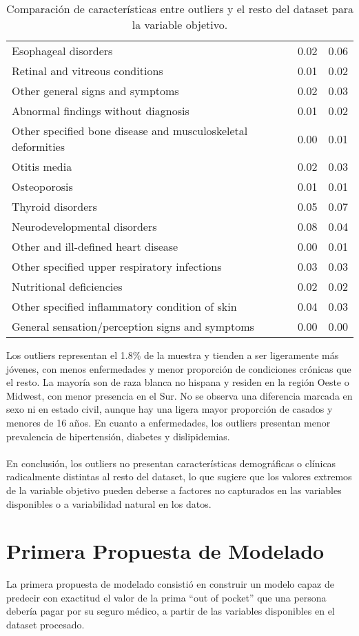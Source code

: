 \documentclass[12pt,a4paper]{article}
\begin{document}
\begin{itemize}
\begin{table}[H]
\begin{tabular}{lcc}
Esophageal disorders & 0.02 & 0.06 \\
Retinal and vitreous conditions & 0.01 & 0.02 \\
Other general signs and symptoms & 0.02 & 0.03 \\
Abnormal findings without diagnosis & 0.01 & 0.02 \\
Other specified bone disease and musculoskeletal deformities & 0.00 & 0.01 \\
Otitis media & 0.02 & 0.03 \\
Osteoporosis & 0.01 & 0.01 \\
Thyroid disorders & 0.05 & 0.07 \\
Neurodevelopmental disorders & 0.08 & 0.04 \\
Other and ill-defined heart disease & 0.00 & 0.01 \\
Other specified upper respiratory infections & 0.03 & 0.03 \\
Nutritional deficiencies & 0.02 & 0.02 \\
Other specified inflammatory condition of skin & 0.04 & 0.03 \\
General sensation/perception signs and symptoms & 0.00 & 0.00 \\
\bottomrule
\end{tabular}
\caption{Comparación de características entre outliers y el resto del dataset para la variable objetivo.}
\end{table}

Los outliers representan el 1.8\% de la muestra y tienden a ser ligeramente más jóvenes, con menos enfermedades y menor proporción de condiciones crónicas que el resto. La mayoría son de raza blanca no hispana y residen en la región Oeste o Midwest, con menor presencia en el Sur. No se observa una diferencia marcada en sexo ni en estado civil, aunque hay una ligera mayor proporción de casados y menores de 16 años. En cuanto a enfermedades, los outliers presentan menor prevalencia de hipertensión, diabetes y dislipidemias.\\\\
En conclusión, los outliers no presentan características demográficas o clínicas radicalmente distintas al resto del dataset, lo que sugiere que los valores extremos de la variable objetivo pueden deberse a factores no capturados en las variables disponibles o a variabilidad natural en los datos.

\section*{Primera Propuesta de Modelado}
La primera propuesta de modelado consistió en construir un modelo capaz de predecir con exactitud el valor de la prima ``out of pocket'' que una persona debería pagar por su seguro médico, a partir de las variables disponibles en el dataset procesado.


\end{itemize}
\end{document}
